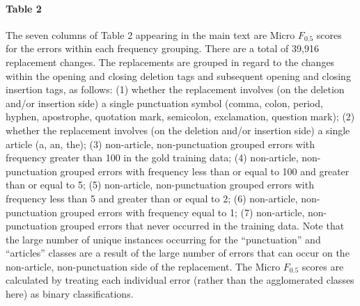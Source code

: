 \documentclass[11pt,letterpaper]{article}
\begin{document}
\paragraph{Table 2} The seven columns of Table 2 appearing in the main text are Micro $F_{0.5}$ scores for the errors within each frequency grouping. There are a total of 39,916 replacement changes. The replacements are grouped in regard to the changes within the opening and closing deletion tags and subsequent opening and closing insertion tags, as follows: (1) whether the replacement involves (on the deletion and/or insertion side) a single punctuation symbol (comma, colon, period, hyphen, apostrophe, quotation mark, semicolon, exclamation, question mark); (2) whether the replacement involves (on the deletion and/or insertion side) a single article (a, an, the); (3) non-article, non-punctuation grouped errors with frequency greater than 100 in the gold training data; (4) non-article, non-punctuation grouped errors with frequency less than or equal to 100 and greater than or equal to 5; (5) non-article, non-punctuation grouped errors with frequency less than 5 and greater than or equal to 2; (6) non-article, non-punctuation grouped errors with frequency equal to 1; (7) non-article, non-punctuation grouped errors that never occurred in the training data. Note that the large number of unique instances occurring for the ``punctuation'' and ``articles'' classes are a result of the large number of errors that can occur on the non-article, non-punctuation side of the replacement. The Micro $F_{0.5}$ scores are calculated by treating each individual error (rather than the agglomerated classes here) as binary classifications.
\end{document}
